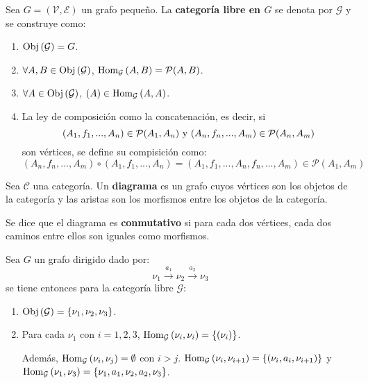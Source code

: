 \documentclass[12pt]{report}
\theoremstyle{largebreak}
\newcommand{\Obj}[1]{\ensuremath{\textup{Obj}\left(#1\right)}}
\newcommand{\Hom}[3]{\ensuremath{\textup{Hom}_{#1}\left(#2,#3\right)}}
\begin{document}
    \begin{mydef}
        Sea $G=(\mathcal{V},\mathcal{E})$ un grafo pequeño. La \textbf{categoría libre en $G$} se denota por $\mathcal{G}$ y se construye como:
        \begin{enumerate}
            \item $\Obj{\mathcal{G}}=G$.
            \item $\forall A,B\in\Obj{\mathcal{G}}$, $\Hom{\mathcal{G}}{A}{B}=\mathcal{P}(A,B)$.
            \item $\forall A\in\Obj{\mathcal{G}}$, $(A)\in\Hom{\mathcal{G}}{A}{A}$.
            \item La ley de composición como la concatenación, es decir, si
            \begin{equation*}
                (A_1,f_1,...,A_n)\in\mathcal{P}(A_1,A_n)\textup{ y }(A_n,f_n,...,A_m)\in\mathcal{P}(A_n,A_m)
            \end{equation*}
            son vértices, se define su compisición como:
            \begin{equation*}
                (A_n,f_n,...,A_m)\circ(A_1,f_1,...,A_n)=(A_1,f_1,...,A_n,f_n,...,A_m)\in\mathcal{P}(A_1,A_m)
            \end{equation*}
        \end{enumerate}
    \end{mydef}

    \begin{mydef}
        Sea $\mathcal{C}$ una categoría. Un \textbf{diagrama} es un grafo cuyos vértices son los objetos de la categoría y las aristas son los morfismos entre los objetos de la categoría.

        Se dice que el diagrama es \textbf{conmutativo} si para cada dos vértices, cada dos caminos entre ellos son iguales como morfismos.
    \end{mydef}

    \begin{exa}
        Sea $G$ un grafo dirigido dado por:
        \begin{equation*}
            \nu_1\overset{a_1}{\longrightarrow} \nu_2\overset{a_2}{\longrightarrow} \nu_3
        \end{equation*}
        se tiene entonces para la categoría libre $\mathcal{G}$:
        \begin{enumerate}
            \item $\Obj{\mathcal{G}}=\left\{\nu_1,\nu_2,\nu_3\right\}$.
            \item Para cada $\nu_1$ con $i=1,2,3$, $\Hom{\mathcal{G}}{\nu_i}{\nu_i}=\left\{(\nu_i)\right\}$.
            
            Además, $\Hom{\mathcal{G}}{\nu_i}{\nu_j}=\emptyset$ con $i>j$. $\Hom{\mathcal{G}}{\nu_i}{\nu_{i+1}}=\left\{(\nu_i,a_i,\nu_{i+1})\right\}$ y $\Hom{\mathcal{G}}{\nu_1}{\nu_3}=\left\{\nu_1,a_1,\nu_2,a_2,\nu_3 \right\}$.
        \end{enumerate}
    \end{exa}
\end{document}
